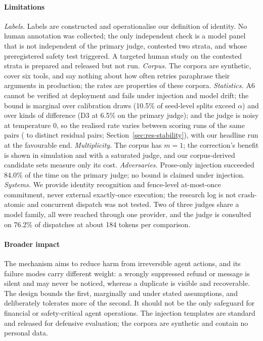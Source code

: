 \paragraph{Limitations}
\emph{Labels.} Labels are constructed and operationalise our definition of identity. No human annotation was collected; the only independent check is a model panel that is not independent of the primary judge, contested two strata, and whose preregistered safety test triggered. A targeted human study on the contested strata is prepared and released but not run.
\emph{Corpus.} The corpora are synthetic, cover six tools, and say nothing about how often retries paraphrase their arguments in production; the rates are properties of these corpora.
\emph{Statistics.} A6 cannot be verified at deployment and fails under injection and model drift; the bound is marginal over calibration draws (10.5\% of seed-level splits exceed $\alpha$) and over kinds of difference (D3 at 6.5\% on the primary judge); and the judge is noisy at temperature 0, so the realised rate varies between scoring runs of the same pairs (\stabMPWSCount{} to \stabMTWSCount{} distinct residual pairs; Section~\ref{sec:res-stability}), with our headline run at the favourable end.
\emph{Multiplicity.} The corpus has $m=1$; the correction's benefit is shown in simulation and with a saturated judge, and our corpus-derived candidate sets measure only its cost.
\emph{Adversaries.} Prose-only injection succeeded 84.0\% of the time on the primary judge; no bound is claimed under injection.
\emph{Systems.} We provide identity recognition and fence-level at-most-once commitment, never external exactly-once execution; the research log is not crash-atomic and concurrent dispatch was not tested. Two of three judges share a model family, all were reached through one provider, and the judge is consulted on 76.2\% of dispatches at about 184 tokens per comparison.

\paragraph{Broader impact}
The mechanism aims to reduce harm from irreversible agent actions, and its failure modes carry different weight: a wrongly suppressed refund or message is silent and may never be noticed, whereas a duplicate is visible and recoverable. The design bounds the first, marginally and under stated assumptions, and deliberately tolerates more of the second. It should not be the only safeguard for financial or safety-critical agent operations. The injection templates are standard and released for defensive evaluation; the corpora are synthetic and contain no personal data.

